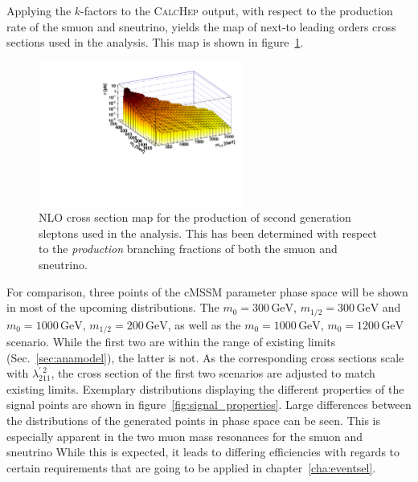 \noindent Applying the $k$-factors to the \textsc{CalcHep} output, with respect to the production rate of the smuon and sneutrino, yields the map of next-to leading orders cross sections used in the analysis. This map is shown in figure~\ref{fig:susy-2dxs}.

\begin{figure}[!htb]
  \centering
  \includegraphics[width=0.6\textwidth]{plots/2dxs.pdf}
  \caption{NLO cross section map for the production of second generation sleptons used in the analysis. This has been determined with respect to the \textit{production} branching fractions of both the smuon and sneutrino.}
  \label{fig:susy-2dxs}
\end{figure}

For comparison, three points of the cMSSM parameter phase space will be shown in most of the upcoming distributions. The $m_0 = 300\,\text{GeV}$, $m_{1/2} = 300\,\text{GeV}$ and $m_0 = 1000\,\text{GeV}$, $m_{1/2} = 200\,\text{GeV}$, as well as the $m_0 = 1000\,\text{GeV}$, $m_0 = 1200\,\text{GeV}$ scenario. While the first two are within the range of existing limits (Sec.~\ref{sec:anamodel}), the latter is not. As the corresponding cross sections scale with $\lambda^{\prime\:2}_{211}$, the cross section of the first two scenarios are adjusted to match existing limits. Exemplary distributions displaying the different properties of the signal points are shown in figure~\ref{fig:signal_properties}. Large differences between the distributions of the generated points in phase space can be seen. This is especially apparent in the two muon mass resonances for the smuon and sneutrino While this is expected, it leads to differing efficiencies with regards to certain requirements that are going to be applied in chapter~\ref{cha:eventsel}.

